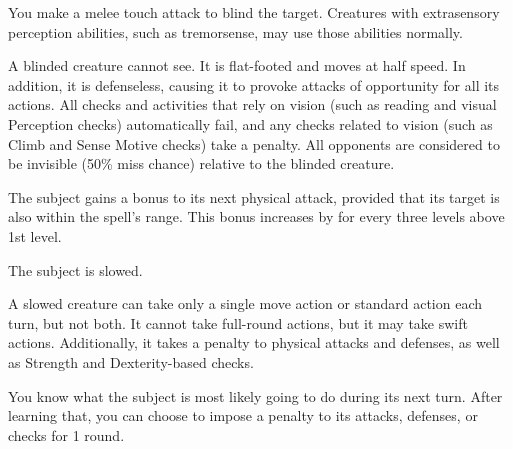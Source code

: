 \begin{spelleffect}
    You make a melee touch attack to blind the target. Creatures with extrasensory perception abilities, such as tremorsense, may use those abilities normally.
\end{spelleffect}
\begin{spellnotes}
    A blinded creature cannot see. It is flat-footed and moves at half speed. In addition, it is defenseless, causing it to provoke attacks of opportunity for all its actions. All checks and activities that rely on vision (such as reading and visual Perception checks) automatically fail, and any checks related to vision (such as Climb and Sense Motive checks) take a  penalty. All opponents are considered to be invisible (50\% miss chance) relative to the blinded creature.
\end{spellnotes}

\spellrng{\rngmed}
\begin{spelleffect}
The subject gains a  bonus to its next physical attack, provided that its target is also within the spell's range. This bonus increases by  for every three levels above 1st level.
\end{spelleffect}

\spellrng{\rngmed}
\begin{spelleffect}
    The subject is slowed.
\end{spelleffect}
\begin{spellnotes}
    A slowed creature can take only a single move action or standard action each turn, but not both. It cannot take full-round actions, but it may take swift actions. Additionally, it takes a  penalty to physical attacks and defenses, as well as Strength and Dexterity-based checks.
\end{spellnotes}

\spellrng{\rngmed}
\begin{spelleffect}
You know what the subject is most likely going to do during its next turn. After learning that, you can choose to impose a  penalty to its attacks, defenses, or checks for 1 round.
\end{spelleffect}
